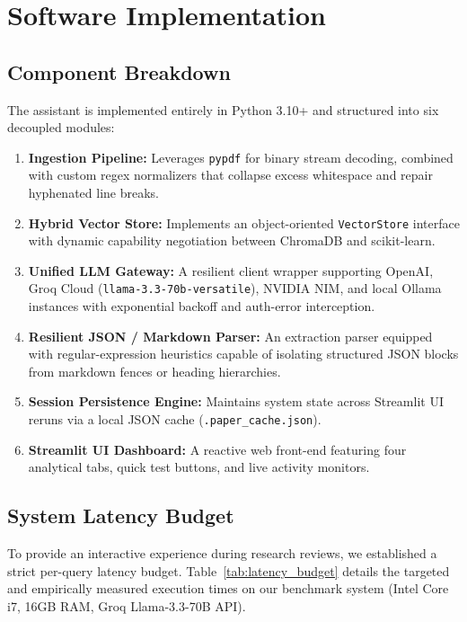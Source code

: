 \documentclass[conference]{IEEEtran}
\begin{document}
\section{Software Implementation}

\subsection{Component Breakdown}
The assistant is implemented entirely in Python 3.10+ and structured into six decoupled modules:
\begin{enumerate}
    \item \textbf{Ingestion Pipeline:} Leverages \texttt{pypdf} for binary stream decoding, combined with custom regex normalizers that collapse excess whitespace and repair hyphenated line breaks.
    \item \textbf{Hybrid Vector Store:} Implements an object-oriented \texttt{VectorStore} interface with dynamic capability negotiation between ChromaDB and scikit-learn.
    \item \textbf{Unified LLM Gateway:} A resilient client wrapper supporting OpenAI, Groq Cloud (\texttt{llama-3.3-70b-versatile}), NVIDIA NIM, and local Ollama instances with exponential backoff and auth-error interception.
    \item \textbf{Resilient JSON / Markdown Parser:} An extraction parser equipped with regular-expression heuristics capable of isolating structured JSON blocks from markdown fences or heading hierarchies.
    \item \textbf{Session Persistence Engine:} Maintains system state across Streamlit UI reruns via a local JSON cache (\texttt{.paper\_cache.json}).
    \item \textbf{Streamlit UI Dashboard:} A reactive web front-end featuring four analytical tabs, quick test buttons, and live activity monitors.
\end{enumerate}

\subsection{System Latency Budget}
To provide an interactive experience during research reviews, we established a strict per-query latency budget. Table~\ref{tab:latency_budget} details the targeted and empirically measured execution times on our benchmark system (Intel Core i7, 16GB RAM, Groq Llama-3.3-70B API).
\end{document}
